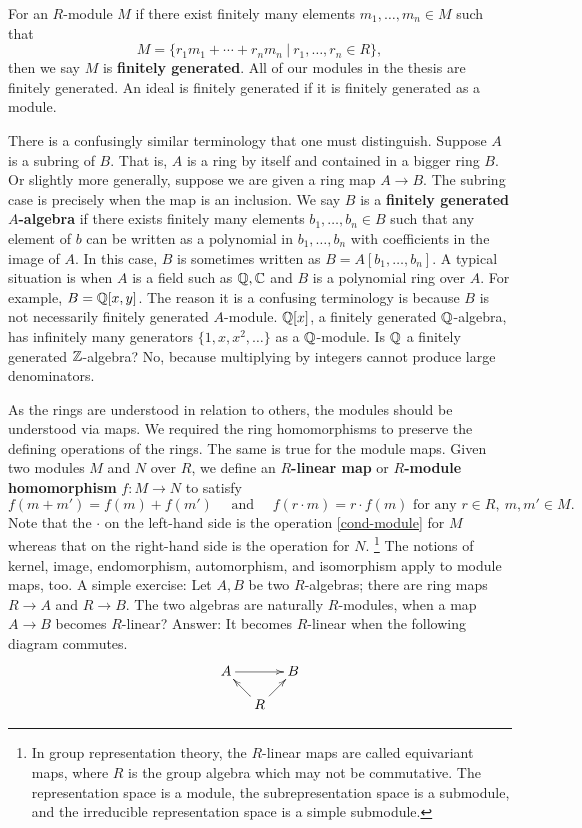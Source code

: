 For an $R$-module $M$ if there exist finitely many elements $m_1,\ldots,m_n \in M$ such that
\begin{equation}
 M = \{ r_1 m_1 + \cdots + r_n m_n ~|~ r_1,\ldots, r_n \in R \},
\end{equation}
then we say $M$ is {\bf finitely generated}.
All of our modules in the thesis are finitely generated.
An ideal is finitely generated if it is finitely generated as a module.

There is a confusingly similar terminology that one must distinguish.
Suppose $A$ is a subring of $B$. That is, $A$ is a ring by itself and contained in a bigger ring $B$.
Or slightly more generally, suppose we are given a ring map $A \to B$.
The subring case is precisely when the map is an inclusion.
We say $B$ is a {\bf finitely generated $A$-algebra}
if there exists finitely many elements $b_1, \ldots, b_n \in B$ such that
any element of $b$ can be written as a polynomial in $b_1,\ldots, b_n$ with coefficients in the image of $A$.
In this case, $B$ is sometimes written as $B = A[b_1,\ldots, b_n]$.
A typical situation is when $A$ is a field such as $\mathbb{Q}, \mathbb{C}$ and $B$ is a polynomial ring over $A$.
For example, $B = \mathbb{Q}[x,y]$.
The reason it is a confusing terminology is because $B$ is not necessarily finitely generated $A$-module.
$\mathbb{Q}[x]$, a finitely generated $\mathbb{Q}$-algebra, has infinitely many generators $\{ 1, x, x^2, \ldots \}$ as a $\mathbb{Q}$-module.
Is $\mathbb{Q}$ a finitely generated $\mathbb{Z}$-algebra? 
No, because multiplying by integers cannot produce large denominators.


As the rings are understood in relation to others,
the modules should be understood via maps.
We required the ring homomorphisms to preserve the defining operations of the rings.
The same is true for the module maps. Given two modules $M$ and $N$ over $R$,
we define an {\bf $R$-linear map} or {\bf $R$-module homomorphism} $f : M \to N$ to satisfy
\begin{equation}
f(m+m') = f(m)+f(m')\quad \text{ and } \quad f(r \cdot m) = r \cdot f(m) \text{ for any } r \in R,~ m, m' \in M.
\end{equation}
Note that the $\cdot$ on the left-hand side is the operation \eqref{cond-module} for $M$
whereas that on the right-hand side is the operation for $N$.%
\footnote{
In group representation theory,
the $R$-linear maps are called equivariant maps,
where $R$ is the group algebra which may not be commutative.
The representation space is a module, 
the subrepresentation space is a submodule, and
the irreducible representation space is a simple submodule.}
The notions of kernel, image, endomorphism, automorphism, and isomorphism apply to module maps, too.
A simple exercise: Let $A,B$ be two $R$-algebras; there are ring maps $R \to A$ and $R \to B$.
The two algebras are naturally $R$-modules, when a map $A \to B$ becomes $R$-linear?
Answer: It becomes $R$-linear when the following diagram commutes.
\[
 \xymatrix@!0{
A \ar[rr]  & & B \\
           & R\ar[ul]\ar[ur] &
}
\]


